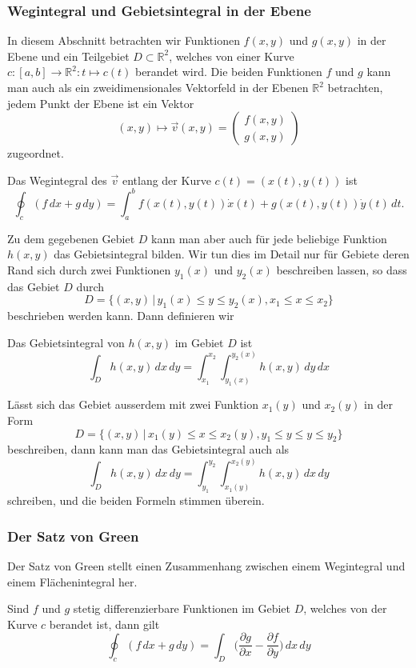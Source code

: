 \subsubsection{Wegintegral und Gebietsintegral in der Ebene}
In diesem Abschnitt betrachten wir Funktionen $f(x,y)$ und $g(x,y)$
in der Ebene und ein Teilgebiet $D\subset \mathbb R^2$, welches
von einer Kurve $c\colon [a,b]\to\mathbb R^2\colon t\mapsto c(t)$
berandet wird.
Die beiden Funktionen $f$ und $g$ kann man auch als ein zweidimensionales
Vektorfeld in der Ebenen $\mathbb R^2$ betrachten, jedem Punkt der
Ebene ist ein Vektor 
\[
(x,y)\mapsto \vec{v}(x,y)=\begin{pmatrix}f(x,y)\\g(x,y)\end{pmatrix}
\]
zugeordnet.

\begin{definition}
Das Wegintegral des $\vec v$ entlang der Kurve $c(t)=(x(t),y(t))$ ist
\[
\oint_c (f\,dx + g\,dy)
= 
\int_a^b f(x(t),y(t)) \dot x(t) + g(x(t),y(t)) \dot y(t)\,dt.
\]
\end{definition}

Zu dem gegebenen Gebiet $D$ kann man aber auch für jede beliebige
Funktion $h(x,y)$ das Gebietsintegral bilden.
Wir tun dies im Detail nur für Gebiete deren Rand sich durch zwei
Funktionen $y_1(x)$ und $y_2(x)$ beschreiben lassen, so dass das
Gebiet $D$ durch
\[
D=\{ (x,y) \,|\, y_1(x) \le y \le y_2(x), x_1\le x\le x_2\}
\]
beschrieben werden kann.
Dann definieren wir

\begin{definition}
Das Gebietsintegral von $h(x,y)$ im Gebiet $D$ ist
\[
\int_D h(x,y)\,dx\,dy = \int_{x_1}^{x_2} \int_{y_1(x)}^{y_2(x)} h(x,y)\,dy\,dx
\]
\end{definition}

Lässt sich das Gebiet ausserdem mit zwei Funktion $x_1(y)$ und $x_2(y)$
in der Form
\[
D=\{(x,y)\,|\, x_1(y)\le x\le x_2(y), y_1\le y\le y\le y_2\}
\]
beschreiben, dann kann man das Gebietsintegral auch als
\[
\int_Dh(x,y)\,dx\,dy
=
\int_{y_1}^{y_2}\int_{x_1(y)}^{x_2(y)} h(x,y)\,dx\,dy
\]
schreiben, und die beiden Formeln stimmen überein.

\subsubsection{Der Satz von Green}
Der Satz von Green stellt einen Zusammenhang zwischen einem Wegintegral
und einem Flächenintegral her.

\begin{satz}[Green]
Sind $f$ und $g$ stetig differenzierbare Funktionen im Gebiet $D$, welches
von der Kurve $c$ berandet ist, dann gilt
\[
\oint_c (f\,dx + g\,dy)
=
\int_D \biggl(\frac{\partial g}{\partial x}
   -\frac{\partial f}{\partial y}\biggr)\,dx\,dy
\]
\end{satz}

